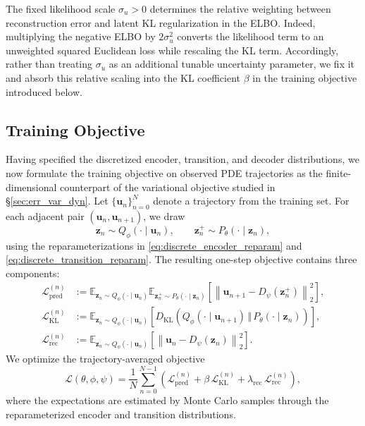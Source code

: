 \documentclass[11pt]{article}
\begin{document}
The fixed likelihood scale $\sigma_u>0$ determines the relative weighting between reconstruction error and latent KL regularization in the ELBO. Indeed, multiplying the negative ELBO by $2\sigma_u^2$ converts the likelihood term to an unweighted squared Euclidean loss while rescaling the KL term. Accordingly, rather than treating $\sigma_u$ as an additional tunable uncertainty parameter, we fix it and absorb this relative scaling into the KL coefficient $\beta$ in the training objective introduced below.

\subsection{Training Objective}
\label{subsec:vamo_training}
Having specified the discretized encoder, transition, and decoder
distributions, we now formulate the training objective on observed PDE trajectories as the finite-dimensional counterpart of the variational objective studied in \S\ref{sec:err_var_dyn}. Let $\{\mathbf u_n\}_{n=0}^{N}$ denote a trajectory from the training set. For each adjacent pair $(\mathbf u_n,\mathbf u_{n+1})$, we draw
\[
    \mathbf z_n\sim Q_\phi(\cdot\mid\mathbf u_n),
    \qquad
    \mathbf z_n^+\sim P_\theta(\cdot\mid\mathbf z_n),
\]
using the reparameterizations in \eqref{eq:discrete_encoder_reparam} and \eqref{eq:discrete_transition_reparam}. The resulting one-step objective contains three components:
\begin{align}
    \mathcal L_{\mathrm{pred}}^{(n)}
    &:=
    \mathbb E_{\mathbf z_n\sim Q_\phi(\cdot\mid\mathbf u_n)}
    \mathbb E_{\mathbf z_n^+\sim P_\theta(\cdot\mid\mathbf z_n)}
    \left[
        \left\|
            \mathbf u_{n+1}
            -
            D_\psi(\mathbf z_n^+)
        \right\|_2^2
    \right],
    \label{eq:vamo_pred_loss}
    \\
    \mathcal L_{\mathrm{KL}}^{(n)}
    &:=
    \mathbb E_{\mathbf z_n\sim Q_\phi(\cdot\mid\mathbf u_n)}
    \left[
        D_{\mathrm{KL}}
        \left(
            Q_\phi(\cdot\mid\mathbf u_{n+1})
            \,\Vert\,
            P_\theta(\cdot\mid\mathbf z_n)
        \right)
    \right],
    \label{eq:vamo_kl_loss}
    \\
    \mathcal L_{\mathrm{rec}}^{(n)}
    &:=
    \mathbb E_{\mathbf z_n\sim Q_\phi(\cdot\mid\mathbf u_n)}
    \left[
        \left\|
            \mathbf u_n-D_\psi(\mathbf z_n)
        \right\|_2^2
    \right].
    \label{eq:vamo_rec_loss}
\end{align}
We optimize the trajectory-averaged objective
\begin{equation}
    \mathcal L(\theta,\phi,\psi)
    =
    \frac{1}{N}
    \sum_{n=0}^{N-1}
    \left(
        \mathcal L_{\mathrm{pred}}^{(n)}
        +
        \beta\,\mathcal L_{\mathrm{KL}}^{(n)}
        +
        \lambda_{\mathrm{rec}}\,
        \mathcal L_{\mathrm{rec}}^{(n)}
    \right),
    \label{eq:implemented_vlm_loss}
\end{equation}
where the expectations are estimated by Monte Carlo samples through the reparameterized encoder and transition distributions.
\end{document}
